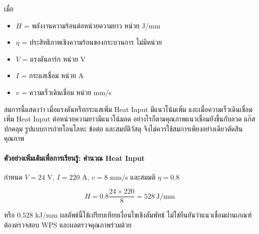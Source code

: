 เมื่อ

\begin{itemize}
    \item $H$ = พลังงานความร้อนต่อหน่วยความยาว หน่วย J/mm
    \item $\eta$ = ประสิทธิภาพเชิงความร้อนของกระบวนการ ไม่มีหน่วย
    \item $V$ = แรงดันอาร์ก หน่วย V
    \item $I$ = กระแสเชื่อม หน่วย A
    \item $v$ = ความเร็วเดินเชื่อม หน่วย mm/s
\end{itemize}

สมการนี้แสดงว่า เมื่อแรงดันหรือกระแสเพิ่ม Heat Input มีแนวโน้มเพิ่ม และเมื่อความเร็วเดินเชื่อมเพิ่ม Heat Input ต่อหน่วยความยาวมีแนวโน้มลด อย่างไรก็ตามคุณภาพแนวเชื่อมยังขึ้นกับลวด แก๊สปกคลุม รูปแบบการถ่ายโอนโลหะ ข้อต่อ และสมบัติวัสดุ จึงไม่ควรใช้สมการเพียงอย่างเดียวตัดสินคุณภาพ

\paragraph{ตัวอย่างเพิ่มเติมเพื่อการเรียนรู้: คำนวณ Heat Input}

กำหนด $V=24$ V, $I=220$ A, $v=8$ mm/s และสมมติ $\eta=0.8$

\[
H=0.8\frac{24\times220}{8}=528\ \text{J/mm}
\]

หรือ $0.528$ kJ/mm ผลลัพธ์นี้ใช้เปรียบเทียบเงื่อนไขเชิงสัมพัทธ์ ไม่ใช่ยืนยันว่าแนวเชื่อมผ่านเกณฑ์ ต้องตรวจสอบ WPS และผลตรวจคุณภาพร่วมด้วย


